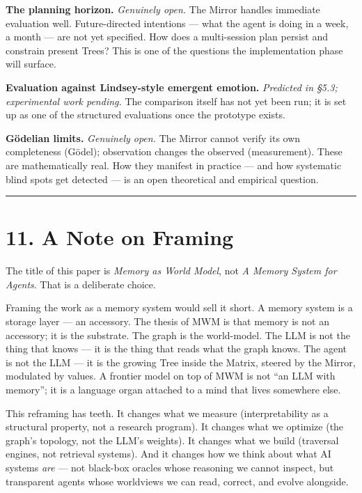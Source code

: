 \documentclass[12pt]{article}
\begin{document}
\textbf{The planning horizon.} \emph{Genuinely open.} The Mirror handles immediate evaluation well. Future-directed intentions --- what the agent is doing in a week, a month --- are not yet specified. How does a multi-session plan persist and constrain present Trees? This is one of the questions the implementation phase will surface.

\textbf{Evaluation against Lindsey-style emergent emotion.} \emph{Predicted in §5.3; experimental work pending.} The comparison itself has not yet been run; it is set up as one of the structured evaluations once the prototype exists.

\textbf{Gödelian limits.} \emph{Genuinely open.} The Mirror cannot verify its own completeness (Gödel); observation changes the observed (measurement). These are mathematically real. How they manifest in practice --- and how systematic blind spots get detected --- is an open theoretical and empirical question.

\begin{center}\rule{0.5\linewidth}{0.5pt}\end{center}

\section{11. A Note on Framing}\label{a-note-on-framing}

The title of this paper is \emph{Memory as World Model}, not \emph{A Memory System for Agents}. That is a deliberate choice.

Framing the work as a memory system would sell it short. A memory system is a storage layer --- an accessory. The thesis of MWM is that memory is not an accessory; it is the substrate. The graph is the world-model. The LLM is not the thing that knows --- it is the thing that reads what the graph knows. The agent is not the LLM --- it is the growing Tree inside the Matrix, steered by the Mirror, modulated by values. A frontier model on top of MWM is not ``an LLM with memory''; it is a language organ attached to a mind that lives somewhere else.

This reframing has teeth. It changes what we measure (interpretability as a structural property, not a research program). It changes what we optimize (the graph's topology, not the LLM's weights). It changes what we build (traversal engines, not retrieval systems). And it changes how we think about what AI systems \emph{are} --- not black-box oracles whose reasoning we cannot inspect, but transparent agents whose worldviews we can read, correct, and evolve alongside.
\end{document}
